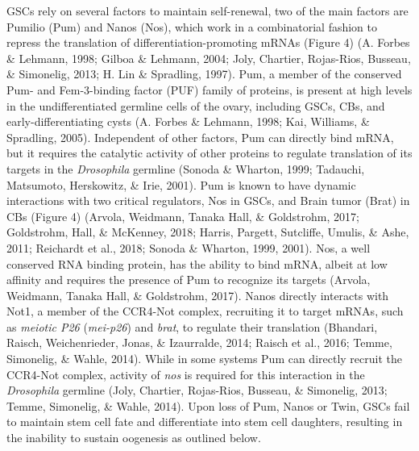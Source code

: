 \documentclass[12pt,oneside]{reedthesis}
\begin{document}
GSCs rely on several factors to maintain self-renewal, two of the main
factors are Pumilio (Pum) and Nanos (Nos), which work in a combinatorial
fashion to repress the translation of differentiation-promoting mRNAs
(Figure 4) (A. Forbes \& Lehmann, 1998; Gilboa \& Lehmann, 2004; Joly, Chartier, Rojas-Rios, Busseau, \& Simonelig, 2013; H. Lin \& Spradling, 1997).
Pum, a member of the conserved Pum- and Fem-3-binding factor (PUF)
family of proteins, is present at high levels in the undifferentiated
germline cells of the ovary, including GSCs, CBs, and
early-differentiating cysts (A. Forbes \& Lehmann, 1998; Kai, Williams, \& Spradling, 2005). Independent of
other factors, Pum can directly bind mRNA, but it requires the catalytic
activity of other proteins to regulate translation of its targets in the
\emph{Drosophila} germline (Sonoda \& Wharton, 1999; Tadauchi, Matsumoto, Herskowitz, \& Irie, 2001). Pum is known
to have dynamic interactions with two critical regulators, Nos in GSCs,
and Brain tumor (Brat) in CBs (Figure 4) (Arvola, Weidmann, Tanaka Hall, \& Goldstrohm, 2017; Goldstrohm, Hall, \& McKenney, 2018; Harris, Pargett, Sutcliffe, Umulis, \& Ashe, 2011; Reichardt et al., 2018; Sonoda \& Wharton, 1999, 2001). Nos, a well conserved RNA binding protein, has the
ability to bind mRNA, albeit at low affinity and requires the presence
of Pum to recognize its targets (Arvola, Weidmann, Tanaka Hall, \& Goldstrohm, 2017). Nanos directly
interacts with Not1, a member of the CCR4-Not complex, recruiting it to
target mRNAs, such as \emph{meiotic P26} (\emph{mei-p26}) and \emph{brat}, to regulate
their translation (Bhandari, Raisch, Weichenrieder, Jonas, \& Izaurralde, 2014; Raisch et al., 2016; Temme, Simonelig, \& Wahle, 2014).
While in some systems Pum can directly recruit the CCR4-Not complex,
activity of \emph{nos} is required for this interaction in the \emph{Drosophila}
germline (Joly, Chartier, Rojas-Rios, Busseau, \& Simonelig, 2013; Temme, Simonelig, \& Wahle, 2014). Upon loss of Pum, Nanos or Twin,
GSCs fail to maintain stem cell fate and differentiate into stem cell
daughters, resulting in the inability to sustain oogenesis as outlined
below.
\end{document}
